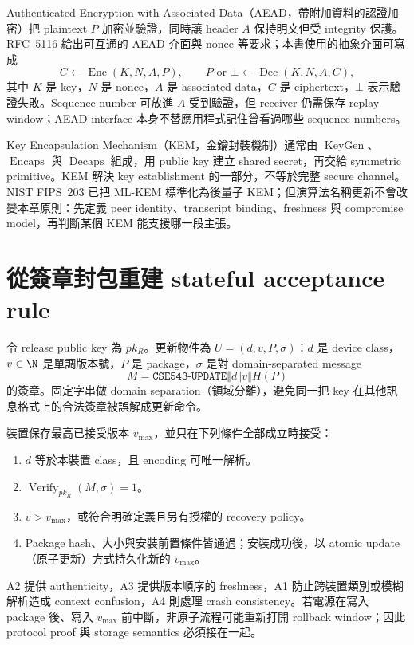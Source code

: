 \documentclass[11pt,a4paper,oneside,openany]{book}
\begin{document}
Authenticated Encryption with Associated Data（AEAD，帶附加資料的認證加密）把 plaintext $P$ 加密並驗證，同時讓 header $A$ 保持明文但受 integrity 保護。RFC~5116 給出可互通的 AEAD 介面與 nonce 等要求\cite{rfc5116}；本書使用的抽象介面可寫成
\[
 C\gets\operatorname{Enc}(K,N,A,P),
 \qquad
 P\text{ or }\bot\gets\operatorname{Dec}(K,N,A,C),
\]
其中 $K$ 是 key，$N$ 是 nonce，$A$ 是 associated data，$C$ 是 ciphertext，$\bot$ 表示驗證失敗。Sequence number 可放進 $A$ 受到驗證，但 receiver 仍需保存 replay window；AEAD interface 本身不替應用程式記住曾看過哪些 sequence numbers。

Key Encapsulation Mechanism（KEM，金鑰封裝機制）通常由 $\operatorname{KeyGen}$、$\operatorname{Encaps}$ 與 $\operatorname{Decaps}$ 組成，用 public key 建立 shared secret，再交給 symmetric primitive。KEM 解決 key establishment 的一部分，不等於完整 secure channel。NIST FIPS~203 已把 ML-KEM 標準化為後量子 KEM\cite{fips203}；但演算法名稱更新不會改變本章原則：先定義 peer identity、transcript binding、freshness 與 compromise model，再判斷某個 KEM 能支援哪一段主張。

\section{從簽章封包重建 stateful acceptance rule}
令 release public key 為 $pk_R$。更新物件為 $U=(d,v,P,\sigma)$：$d$ 是 device class，$v\in\N$ 是單調版本號，$P$ 是 package，$\sigma$ 是對 domain-separated message
\[
 M=\texttt{CSE543-UPDATE}\mathbin\Vert d\mathbin\Vert v\mathbin\Vert H(P)
\]
的簽章。固定字串做 domain separation（領域分離），避免同一把 key 在其他訊息格式上的合法簽章被誤解成更新命令。

裝置保存最高已接受版本 $v_{\max}$，並只在下列條件全部成立時接受：
\begin{enumerate}[label=\textbf{A\arabic*.}]
\item $d$ 等於本裝置 class，且 encoding 可唯一解析。
\item $\operatorname{Verify}_{pk_R}(M,\sigma)=1$。
\item $v>v_{\max}$，或符合明確定義且另有授權的 recovery policy。
\item Package hash、大小與安裝前置條件皆通過；安裝成功後，以 atomic update（原子更新）方式持久化新的 $v_{\max}$。
\end{enumerate}

A2 提供 authenticity，A3 提供版本順序的 freshness，A1 防止跨裝置類別或模糊解析造成 context confusion，A4 則處理 crash consistency。若電源在寫入 package 後、寫入 $v_{\max}$ 前中斷，非原子流程可能重新打開 rollback window；因此 protocol proof 與 storage semantics 必須接在一起。
\end{document}
